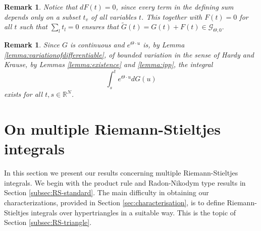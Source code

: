 \documentclass[english, a4paper, 12pt,reqno]{amsart}
\newtheorem{rem}[defi]{Remark}
\begin{document}
\begin{rem}
\label{rem:equivalence}
Notice that $dF(t) = 0$, since every term in the defining sum depends only on a subset $t_v$ of all variables $t$. This together with $F(t)=0$ for all $t$ such that $\sum_l t_l =0$ ensures that $\tilde{G}(t) = G(t) + F(t)\in\mathcal{G}_{\Theta,0}.$ 
\end{rem}

\begin{rem}
\label{rem:existence}
Since $G$ is continuous and $e^{\Theta\cdot u}$ is, by Lemma \ref{lemma:variationofdifferentiable}, of bounded variation in the sense of Hardy and Krause, by Lemmas \ref{lemma:existence} and \ref{lemma:ipp}, the integral
$$\int_s^t e^{\Theta\cdot u} dG(u)$$
exists for all $t,s \in\mathbb{R}^N$.
\end{rem}


\section{On multiple Riemann-Stieltjes integrals}
\label{sec:RS}
In this section we present our results concerning multiple Riemann-Stieltjes integrals. We begin with the product rule and Radon-Nikodym type results in Section \ref{subsec:RS-standard}. The main difficulty in obtaining our characterizations, provided in Section \ref{sec:characterisation}, is to define Riemann-Stieltjes integrals over hypertriangles in a suitable way. This is the topic of Section \ref{subsec:RS-triangle}.
\end{document}
